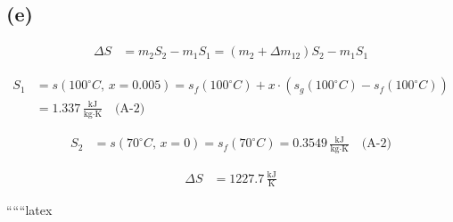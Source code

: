 

\subsection*{(e)}

\begin{align*}
\Delta S &= m_2 S_2 - m_1 S_1 = (m_2 + \Delta m_{12}) S_2 - m_1 S_1
\end{align*}

\begin{align*}
S_1 &= s(100^\circ C, \, x=0.005) = s_f(100^\circ C) + x \cdot (s_g(100^\circ C) - s_f(100^\circ C)) \\
&= 1.337 \, \frac{\text{kJ}}{\text{kg} \cdot \text{K}} \quad \text{(A-2)}
\end{align*}

\begin{align*}
S_2 &= s(70^\circ C, \, x=0) = s_f(70^\circ C) = 0.3549 \, \frac{\text{kJ}}{\text{kg} \cdot \text{K}} \quad \text{(A-2)}
\end{align*}

\begin{align*}
\Delta S &= 1227.7 \, \frac{\text{kJ}}{\text{K}}
\end{align*}

``````latex